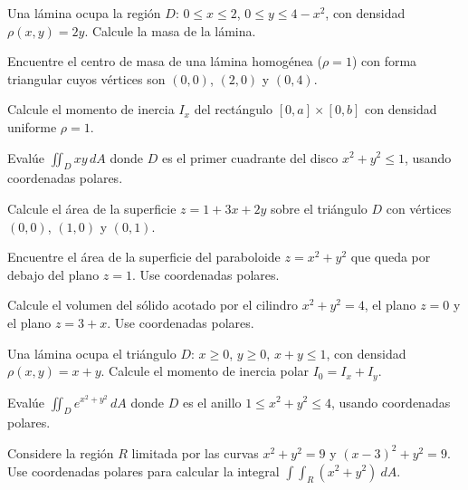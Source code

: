 \begin{prob}
Una lámina ocupa la región $D$: $0\leq x\leq 2$, $0\leq y\leq 4-x^2$, con densidad $\rho(x,y)=2y$. Calcule la masa de la lámina.
\end{prob}

\begin{prob}
Encuentre el centro de masa de una lámina homogénea ($\rho=1$) con forma triangular cuyos vértices son $(0,0)$, $(2,0)$ y $(0,4)$.
\end{prob}

\begin{prob}
Calcule el momento de inercia $I_x$ del rectángulo $[0,a]\times[0,b]$ con densidad uniforme $\rho=1$.
\end{prob}

\begin{prob}
Evalúe $\displaystyle\iint_D xy\,dA$ donde $D$ es el primer cuadrante del disco $x^2+y^2\leq 1$, usando coordenadas polares.
\end{prob}


\begin{prob}
Calcule el área de la superficie $z=1+3x+2y$ sobre el triángulo $D$ con vértices $(0,0)$, $(1,0)$ y $(0,1)$.
\end{prob}


\begin{prob}
Encuentre el área de la superficie del paraboloide $z=x^2+y^2$ que queda por debajo del plano $z=1$. Use coordenadas polares.
\end{prob}

\begin{prob}
Calcule el volumen del sólido acotado por el cilindro $x^2+y^2=4$, el plano $z=0$ y el plano $z=3+x$. Use coordenadas polares.
\end{prob}

\begin{prob}
Una lámina ocupa el triángulo $D$: $x\geq 0$, $y\geq 0$, $x+y\leq 1$, con densidad $\rho(x,y)=x+y$. Calcule el momento de inercia polar $I_0=I_x+I_y$.
\end{prob}

\begin{prob}
Evalúe $\displaystyle\iint_D e^{x^2+y^2}\,dA$ donde $D$ es el anillo $1\leq x^2+y^2\leq 4$, usando coordenadas polares.
\end{prob}

\begin{prob}
Considere la región $R$ limitada por las curvas $x^2+y^2=9$ y  $(x - 3)^{2} + y^{2} = 9.$ Use coordenadas polares para calcular la integral $\displaystyle\int\int_{R}  \left(x^2+y^2\right)\ dA$.
\end{prob}


